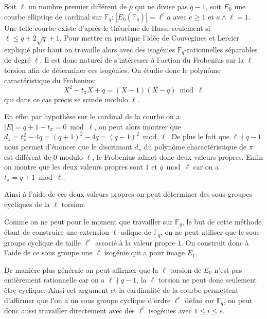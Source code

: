 \documentclass[10pt,a4paper]{book}
\theoremstyle{plain}
\theoremstyle{definition}
\theoremstyle{definition}
\theoremstyle{definition}
\theoremstyle{definition}
\theoremstyle{remark}
\theoremstyle{remark}
\begin{document}
Soit $\ell$ un nombre premier différent de $p$ qui ne divise pas $q-1$, soit $E_0$ une courbe elliptiqe de cardinal sur $\mathbb{F}_q$: $|E_0(\mathbb{F}_q)|=\ell^e a$ avec $e \geqslant 1$ et $a \wedge \ell =1$. Une telle courbe existe d'après le théorème de Hasse seulement si $\ell \leqslant q+2\sqrt{q} +1$.  
Pour mettre en pratique l'idée de Couvegines et Lercier \cite{couveignesLercier2013} expliqué plus haut on travaille alors avec des isogénies $\mathbb{F}_q$-rationnelles séparables de degré $\ell$. Il est donc naturel de s'intéresser à l'action du Frobenius sur la $\ell$ torsion afin de déterminer ces isogénies. On étudie donc le polynôme caractéristique du Frobenius:
\begin{equation*}
X^2-t_{\pi}X+q=(X-1)(X-q) \bmod \ell
\end{equation*}
qui dans ce cas précis se scinde modulo $\ell$.


En effet par hypothèse sur le cardinal de la courbe on a: $|E|=q+1-t_{\pi}=0 \bmod \ell$, on peut alors montrer que $d_{\pi}=t_{\pi}^2-4q=(q+1)^2-4q=(q-1)^2 \bmod \ell$. De plus le fait que $\ell \nmid q-1$ nous permet d'énoncer que le discrimant $d_{\pi}$ du polynôme charactéristique de $\pi$ est différent de $0$ modulo $\ell$, le Frobenius admet donc deux valeurs propres. Enfin on montre que les deux valeurs propres sont $1$ et $q \bmod \ell$ car on a $t_{\pi}=q+1 \bmod \ell$.

Ainsi à l'aide de ces deux valeurs propres on peut déterminer des sous-groupes cycliques de la $\ell$ torsion. 

Comme on ne peut pour le moment que travailler sur $\mathbb{F}_q$, le but de cette méthode étant de construire une extension $\ell$-adique de $\mathbb{F}_q$, on ne peut utiliser que le sous-groupe cyclique de taille $\ell^e$ associé à la valeur propre $1$. On construit donc à l'aide de ce sous groupe une $\ell$ isogénie qui a pour image $E_1$. 

De manière plus générale  on peut affirmer que la $\ell$ torsion de $E_0$ n'est pas entièrement rationnelle car on a $\ell \nmid q-1$, la $\ell$ torsion ne peut donc seulement être cyclique. Ainsi cet argument et la cardinalité de la courbe permettent d'affirmer que l'on a un sous groupe cyclique d'ordre $\ell^e$ défini sur $\mathbb{F}_q$, on peut donc aussi travailler directement avec des $\ell^i$ isogénies avec $1 \leqslant i \leqslant e$.
\end{document}
